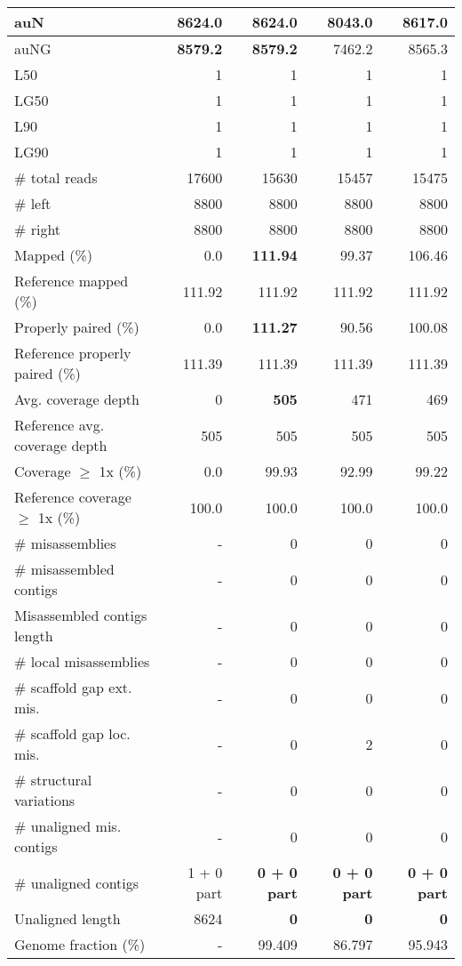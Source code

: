 \documentclass[12pt,a4paper]{article}
\begin{document}
\begin{table}[ht]
\begin{center}
\begin{tabular}{|l*{4}{|r}|}
auN & {\bf 8624.0} & {\bf 8624.0} & 8043.0 & 8617.0 \\ \hline
auNG & {\bf 8579.2} & {\bf 8579.2} & 7462.2 & 8565.3 \\ \hline
L50 & 1 & 1 & 1 & 1 \\ \hline
LG50 & 1 & 1 & 1 & 1 \\ \hline
L90 & 1 & 1 & 1 & 1 \\ \hline
LG90 & 1 & 1 & 1 & 1 \\ \hline
\# total reads & 17600 & 15630 & 15457 & 15475 \\ \hline
\# left & 8800 & 8800 & 8800 & 8800 \\ \hline
\# right & 8800 & 8800 & 8800 & 8800 \\ \hline
Mapped (\%) & 0.0 & {\bf 111.94} & 99.37 & 106.46 \\ \hline
Reference mapped (\%) & 111.92 & 111.92 & 111.92 & 111.92 \\ \hline
Properly paired (\%) & 0.0 & {\bf 111.27} & 90.56 & 100.08 \\ \hline
Reference properly paired (\%) & 111.39 & 111.39 & 111.39 & 111.39 \\ \hline
Avg. coverage depth & 0 & {\bf 505} & 471 & 469 \\ \hline
Reference avg. coverage depth & 505 & 505 & 505 & 505 \\ \hline
Coverage $\geq$ 1x (\%) & 0.0 & 99.93 & 92.99 & 99.22 \\ \hline
Reference coverage $\geq$ 1x (\%) & 100.0 & 100.0 & 100.0 & 100.0 \\ \hline
\# misassemblies & - & 0 & 0 & 0 \\ \hline
\# misassembled contigs & - & 0 & 0 & 0 \\ \hline
Misassembled contigs length & - & 0 & 0 & 0 \\ \hline
\# local misassemblies & - & 0 & 0 & 0 \\ \hline
\# scaffold gap ext. mis. & - & 0 & 0 & 0 \\ \hline
\# scaffold gap loc. mis. & - & 0 & 2 & 0 \\ \hline
\# structural variations & - & 0 & 0 & 0 \\ \hline
\# unaligned mis. contigs & - & 0 & 0 & 0 \\ \hline
\# unaligned contigs & 1 + 0 part & {\bf 0 + 0 part} & {\bf 0 + 0 part} & {\bf 0 + 0 part} \\ \hline
Unaligned length & 8624 & {\bf 0} & {\bf 0} & {\bf 0} \\ \hline
Genome fraction (\%) & - & 99.409 & 86.797 & 95.943 \\ \hline

\end{tabular}
\end{center}
\end{table}
\end{document}
